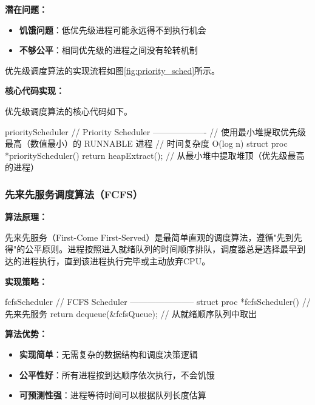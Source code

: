 \documentclass[a4paper, 12pt]{article}
\begin{document}
    \textbf{潜在问题：}
    \begin{itemize}[itemsep=0pt]
        \item \textbf{饥饿问题}：低优先级进程可能永远得不到执行机会
        \item \textbf{不够公平}：相同优先级的进程之间没有轮转机制
    \end{itemize}
    
    优先级调度算法的实现流程如图\ref{fig:priority_sched}所示。
    
    
    \textbf{核心代码实现：}
    
    优先级调度算法的核心代码如下。
    \begin{codeblock}{priorityScheduler}
        // Priority Scheduler -------------------
        // 使用最小堆提取优先级最高（数值最小）的 RUNNABLE 进程
        // 时间复杂度 O(log n)
        struct proc *priorityScheduler() {
        return heapExtract();  // 从最小堆中提取堆顶（优先级最高的进程）
        }
    \end{codeblock}

    
    \subsubsection{先来先服务调度算法（FCFS）}
    
    \textbf{算法原理：}
    
    先来先服务（First-Come First-Served）是最简单直观的调度算法，遵循"先到先得"的公平原则。进程按照进入就绪队列的时间顺序排队，调度器总是选择最早到达的进程执行，直到该进程执行完毕或主动放弃CPU。
   
    
    \textbf{实现策略：}
    
    \begin{codeblock}{fcfsScheduler}
        // FCFS Scheduler -----------------------
        struct proc *fcfsScheduler() { // 先来先服务
        return dequeue(\&fcfsQueue);  // 从就绪顺序队列中取出
        }
    \end{codeblock}
    
    
    \textbf{算法优势：}
    \begin{itemize}[itemsep=0pt]
        \item \textbf{实现简单}：无需复杂的数据结构和调度决策逻辑
        \item \textbf{公平性好}：所有进程按到达顺序依次执行，不会饥饿
        \item \textbf{可预测性强}：进程等待时间可以根据队列长度估算
    \end{itemize}
    
\end{document}
